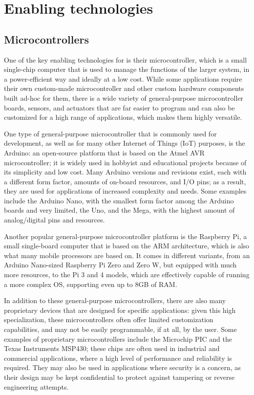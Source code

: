 \section{Enabling technologies}
\subsection{Microcontrollers}
One of the key enabling technologies for \ess is their microcontroller, which is a small single-chip computer that is used to manage the functions of the larger system, in a power-efficient way and ideally at a low cost. While some applications require their own custom-made microcontroller and other custom hardware components built ad-hoc for them, there is a wide variety of general-purpose microcontroller boards, sensors, and actuators that are far easier to program and can also be customized for a high range of applications, which makes them highly versatile.

One type of general-purpose microcontroller that is commonly used for \ess development, as well as for many other Internet of Things (IoT) purposes, is the Arduino: an open-source platform that is based on the Atmel AVR microcontroller; it is widely used in hobbyist and educational projects because of its simplicity and low cost. Many Arduino versions and revisions exist, each with a different form factor, amounts of on-board resources, and I/O pins; as a result, they are used for applications of increased complexity and needs. Some examples include the Arduino Nano, with the smallest form factor among the Arduino boards and very limited, the Uno, and the Mega, with the highest amount of analog/digital pins and resources.

Another popular general-purpose microcontroller platform is the Raspberry Pi, a small single-board computer that is based on the ARM architecture, which is also what many mobile processors are based on. It comes in different variants, from an Arduino Nano-sized Raspberry Pi Zero and Zero W, but equipped with much more resources, to the Pi 3 and 4 models, which are effectively capable of running a more complex OS, supporting even up to 8GB of RAM.

In addition to these general-purpose microcontrollers, there are also many proprietary devices that are designed for specific applications: given this high specialization, these microcontrollers often offer limited customization capabilities, and may not be easily programmable, if at all, by the user. Some examples of proprietary microcontrollers include the Microchip PIC and the Texas Instruments MSP430; these chips are often used in industrial and commercial applications, where a high level of performance and reliability is required. They may also be used in applications where security is a concern, as their design may be kept confidential to protect against tampering or reverse engineering attempts.

